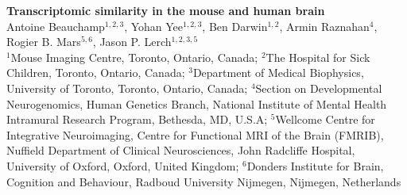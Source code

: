 
\LARGE{\textbf{Transcriptomic similarity in the mouse and human brain}}\\

\large
Antoine Beauchamp$^{1,2,3}$, Yohan Yee$^{1,2,3}$, Ben Darwin$^{1,2}$, Armin Raznahan$^{4}$, Rogier B. Mars$^{5,6}$, Jason P. Lerch$^{1,2,3,5}$\\

\small
$^1$Mouse Imaging Centre, Toronto, Ontario, Canada; $^2$The Hospital for Sick Children, Toronto, Ontario, Canada; $^3$Department of Medical Biophysics, University of Toronto, Toronto, Ontario, Canada; $^4$Section on Developmental Neurogenomics, Human Genetics Branch, National Institute of Mental Health Intramural Research Program, Bethesda, MD, U.S.A; $^5$Wellcome Centre for Integrative Neuroimaging, Centre for Functional MRI of the Brain (FMRIB), Nuffield Department of Clinical Neurosciences, John Radcliffe Hospital, University of Oxford, Oxford, United Kingdom; $^6$Donders Institute for Brain, Cognition and Behaviour, Radboud University Nijmegen, Nijmegen, Netherlands

\normalsize
{}